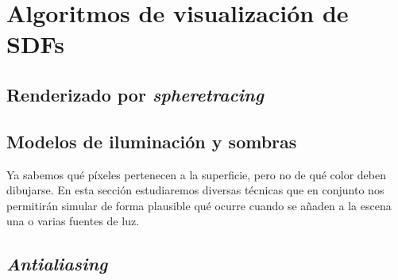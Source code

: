 \chapter{Algoritmos de visualización de SDFs}

\section{Renderizado por \textit{spheretracing}}\label{sec:render}


\section{Modelos de iluminación y sombras}\label{sec:ilum}
Ya sabemos qué píxeles pertenecen a la superficie, pero no de qué color deben dibujarse. En esta sección estudiaremos diversas técnicas que en conjunto nos permitirán simular de forma plausible qué ocurre cuando se añaden a la escena una o varias fuentes de luz.






\section{\textit{Antialiasing}}
